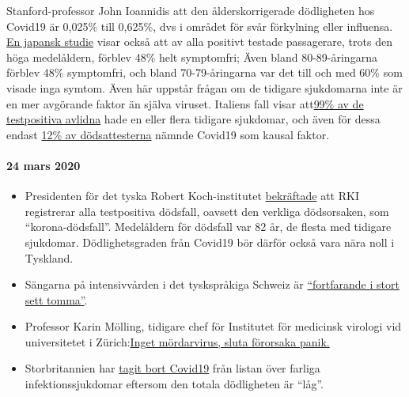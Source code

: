 \begin{itemize}
  Stanford-professor John Ioannidis att den ålderskorrigerade
  dödligheten hos Covid19 är 0,025\% till 0,625\%, dvs i området för
  svår förkylning eller influensa.
  \href{https://www.niid.go.jp/niid/en/2019-ncov-e/9407-covid-dp-fe-01.html}{En
  japansk studie} visar också att av alla positivt testade passagerare,
  trots den höga medelåldern, förblev 48\% helt symptomfri; Även bland
  80-89-åringarna förblev 48\% symptomfri, och bland 70-79-åringarna var
  det till och med 60\% som visade inga symtom. Även här uppstår frågan
  om de tidigare sjukdomarna inte är en mer avgörande faktor än själva
  viruset. Italiens fall visar
  att\href{https://www.bloomberg.com/news/articles/2020-03-18/99-of-those-who-died-from-virus-had-other-illness-italy-says}{99\%
  av de testpositiva avlidna} hade en eller flera tidigare sjukdomar,
  och även för dessa endast
  \href{https://web.archive.org/web/20200324214448/https://www.telegraph.co.uk/global-health/science-and-disease/have-many-coronavirus-patients-died-italy/}{12\%
  av dödsattesterna} nämnde Covid19 som kausal faktor.
\end{itemize}

\hypertarget{24-mars-2020}{%
\paragraph{24 mars 2020}\label{24-mars-2020}}

\begin{itemize}
\tightlist
\item
  Presidenten för det tyska Robert Koch-institutet
  \href{https://swprs.org/rki-relativiert-corona-todesfaelle/}{bekräftade}
  att RKI registrerar alla testpositiva dödsfall, oavsett den verkliga
  dödsorsaken, som ``korona-dödsfall''. Medelåldern för dödsfall var 82
  år, de flesta med tidigare sjukdomar. Dödlighetsgraden från Covid19
  bör därför också vara nära noll i Tyskland.
\item
  Sängarna på intensivvården i det tyskspråkiga Schweiz är
  \href{https://www.aargauerzeitung.ch/aargau/kanton-aargau/erst-3-von-100-aargauer-betten-der-intensivstationen-sind-belegt-so-ruesten-sich-die-spitaeler-auf-die-epidemie-137332716}{``fortfarande
  i stort sett tomma''}.
\item
  Professor Karin Mölling, tidigare chef för Institutet för medicinsk
  virologi vid universitetet i
  Zürich:\href{https://www.radioeins.de/programm/sendungen/die_profis/archivierte_sendungen/beitraege/corona-virus-kein-killervirus.html}{Inget
  mördarvirus, sluta förorsaka panik.}
\item
  Storbritannien har
  \href{https://www.gov.uk/guidance/high-consequence-infectious-diseases-hcid\#status-of-covid-19}{tagit
  bort Covid19} från listan över farliga infektionssjukdomar eftersom
  den totala dödligheten är ``låg''.
\end{itemize}


